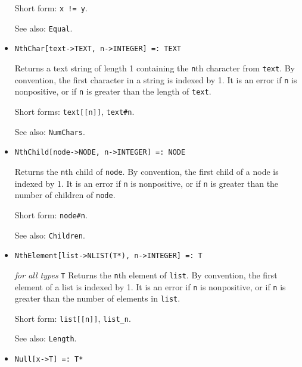 \begin{itemize}
{\it for all types} {\tt T}
\bd
Returns \verb+True+ when the values of \verb+x+ and \verb+y+ are
not equal.
\item [Short form:] \verb+x != y+.
\item [See also:] \verb+Equal+.
\ed

\item{}
\protect \large \begin{verbatim}
NthChar[text->TEXT, n->INTEGER] =: TEXT
\end{verbatim}\normalsize

\bd
Returns a text string of length 1 containing the \verb+n+th
character from \verb+text+.  By convention, the first character
in a string is indexed by 1.  It is an error if \verb+n+ is nonpositive,
or if \verb+n+ is greater than the length of \verb+text+.
\item [Short forms:] \verb+text[[n]]+, \verb+text#n+.
\item [See also:] \verb+NumChars+.
\ed

\item{}
\protect \large \begin{verbatim} 
NthChild[node->NODE, n->INTEGER] =: NODE
\end{verbatim}\normalsize

\bd
Returns the \verb+n+th child of \verb+node+.
By convention, the first child of a node is indexed by 1.
It is an error if \verb+n+ is nonpositive, or if \verb+n+ is greater
than the number of children of \verb+node+.
\item [Short form:] \verb+node#n+.
\item [See also:] \verb+Children+.
\ed

\item{}
\protect \large \begin{verbatim}
NthElement[list->NLIST(T*), n->INTEGER] =: T 
\end{verbatim}\normalsize

{\it for all types} {\tt T}
\bd
Returns the \verb+n+th element of \verb+list+.
By convention, the first element of a list is indexed by 1.
It is an error if \verb+n+ is nonpositive, or if \verb+n+ is greater
than the number of elements in \verb+list+.
\item [Short form:] \verb+list[[n]]+, \verb+list_n+.
\item [See also:] \verb+Length+.
\ed

\item{}
\protect \large \begin{verbatim}
Null[x->T] =: T*
\end{verbatim}\normalsize


\end{itemize}
